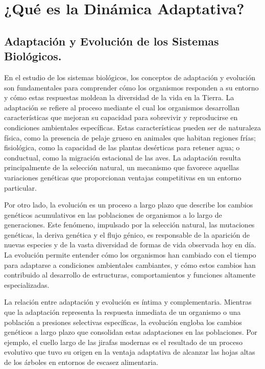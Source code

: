 \section{¿Qué es la Dinámica Adaptativa?}

\subsection{Adaptación y Evolución de los Sistemas Biológicos.}

En el estudio de los sistemas biológicos, los conceptos de adaptación y evolución son fundamentales para comprender cómo los organismos responden a su entorno y cómo estas respuestas moldean la diversidad de la vida en la Tierra. \citep{adaptacion} La adaptación se refiere al proceso mediante el cual los organismos desarrollan características que mejoran su capacidad para sobrevivir y reproducirse en condiciones ambientales específicas. Estas características pueden ser de naturaleza física, como la presencia de pelaje grueso en animales que habitan regiones frías; fisiológica, como la capacidad de las plantas desérticas para retener agua; o conductual, como la migración estacional de las aves. La adaptación resulta principalmente de la selección natural, un mecanismo que favorece aquellas variaciones genéticas que proporcionan ventajas competitivas en un entorno particular.

\citep{evolucion} Por otro lado, la evolución es un proceso a largo plazo que describe los cambios genéticos acumulativos en las poblaciones de organismos a lo largo de generaciones. Este fenómeno, impulsado por la selección natural, las mutaciones genéticas, la deriva genética y el flujo génico, es responsable de la aparición de nuevas especies y de la vasta diversidad de formas de vida observada hoy en día. La evolución permite entender cómo los organismos han cambiado con el tiempo para adaptarse a condiciones ambientales cambiantes, y cómo estos cambios han contribuido al desarrollo de estructuras, comportamientos y funciones altamente especializadas.

La relación entre adaptación y evolución es íntima y complementaria. Mientras que la adaptación representa la respuesta inmediata de un organismo o una población a presiones selectivas específicas, la evolución engloba los cambios genéticos a largo plazo que consolidan estas adaptaciones en las poblaciones. Por ejemplo, el cuello largo de las jirafas modernas es el resultado de un proceso evolutivo que tuvo su origen en la ventaja adaptativa de alcanzar las hojas altas de los árboles en entornos de escasez alimentaria.

